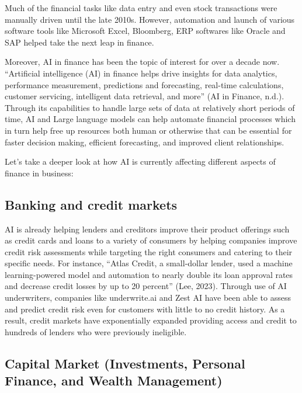 \documentclass[
]{article}
\begin{document}
Much of the financial tasks like data entry and even stock transactions were manually driven until the late 2010s. However, automation and launch of various software tools like Microsoft Excel, Bloomberg, ERP softwares like Oracle and SAP helped take the next leap in finance.

Moreover, AI in finance has been the topic of interest for over a decade now. ``Artificial intelligence (AI) in finance helps drive insights for data analytics, performance measurement, predictions and forecasting, real-time calculations, customer servicing, intelligent data retrieval, and more'' (AI in Finance, n.d.). Through its capabilities to handle large sets of data at relatively short periods of time, AI and Large language models can help automate financial processes which in turn help free up resources both human or otherwise that can be essential for faster decision making, efficient forecasting, and improved client relationships.

Let's take a deeper look at how AI is currently affecting different aspects of finance in business:

\hypertarget{banking-and-credit-markets}{%
\subsection{Banking and credit markets}\label{banking-and-credit-markets}}

AI is already helping lenders and creditors improve their product offerings such as credit cards and loans to a variety of consumers by helping companies improve credit risk assessments while targeting the right consumers and catering to their specific needs. For instance, ``Atlas Credit, a small-dollar lender, used a machine learning-powered model and automation to nearly double its loan approval rates and decrease credit losses by up to 20 percent'' (Lee, 2023). Through use of AI underwriters, companies like underwrite.ai and Zest AI have been able to assess and predict credit risk even for customers with little to no credit history. As a result, credit markets have exponentially expanded providing access and credit to hundreds of lenders who were previously ineligible.

\hypertarget{capital-market-investments-personal-finance-and-wealth-management}{%
\subsection{Capital Market (Investments, Personal Finance, and Wealth Management)}\label{capital-market-investments-personal-finance-and-wealth-management}}
\end{document}
